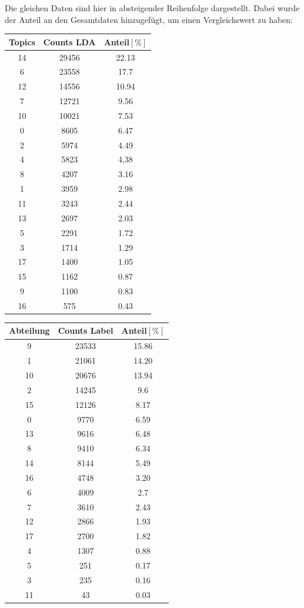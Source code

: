 \documentclass[german,version-2020-11]{uzl-thesis}
\begin{document}
\begin{enumerate}
Die gleichen Daten sind hier in absteigender Reihenfolge dargestellt. Dabei wurde der Anteil an den Gesamtdaten hinzugefügt, um einen Vergleichswert zu haben:

\begin{center}
\begin{tabular}{ccc}
\hline 
\hline
Topics & Counts LDA & Anteil$[\%]$\\
\hline
14&29456&22.13\\
6&23558&17.7\\
12&14556&10.94\\
7&12721&9.56\\
10&10021&7.53\\
0&8605&6.47\\
2&5974&4.49\\
4&5823&4,38\\
8&4207&3.16\\
1&3959&2.98\\
11&3243&2.44\\
13&2697&2.03\\
5&2291&1.72\\
3&1714&1.29\\
17&1400&1.05\\
15&1162&0.87\\
9&1100&0.83\\
16&575&0.43\\
\hline
\hline
\end{tabular}
\quad
\begin{tabular}{ccc}
\hline
\hline
Abteilung & Counts Label & Anteil$[\%]$\\
\hline
9&23533&15.86\\
1&21061&14.20\\
10&20676&13.94\\
2&14245&9.6\\
15&12126&8.17\\
0&9770&6.59\\
13&9616&6.48\\
8&9410&6.34\\
14&8144&5.49\\
16&4748&3.20\\
6&4009&2.7\\
7&3610&2.43\\
12&2866&1.93\\
17&2700&1.82\\
4&1307&0.88\\
5&251& 0.17\\
3&235&0.16\\
11&43&0.03\\
\hline
\hline
\end{tabular}
\end{center}\\




\end{enumerate}
\end{document}
